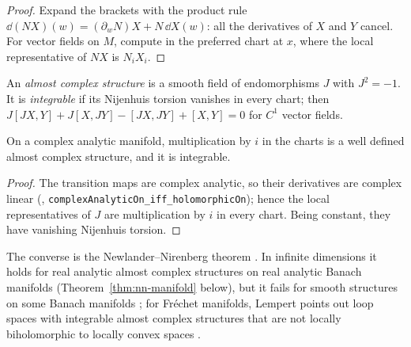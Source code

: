 \begin{proof}
  \leanok
  Expand the brackets with the product rule $\dd(NX)(w) = (\partial_w N) X + N\,\dd X(w)$: all
  the derivatives of $X$ and $Y$ cancel. For vector fields on $M$, compute in the preferred chart
  at $x$, where the local representative of $NX$ is $N_i X_i$.
\end{proof}

\begin{definition}
  \label{def:almost-complex}
  \leanok
  An \emph{almost complex structure} is a smooth field of endomorphisms $J$ with $J^2 = -1$. It
  is \emph{integrable} if its Nijenhuis torsion vanishes in every chart; then
  $J[JX, Y] + J[X, JY] - [JX, JY] + [X, Y] = 0$ for $C^1$ vector fields.
\end{definition}

\begin{theorem}
  \label{thm:canonical-J}
  \leanok
  On a complex analytic manifold, multiplication by $i$ in the charts is a well defined almost
  complex structure, and it is integrable.
\end{theorem}

\begin{proof}
  \leanok
  The transition maps are complex analytic, so their derivatives are complex linear
  (\cite{LCA}, \texttt{complexAnalyticOn\_iff\_holomorphicOn}); hence the local representatives
  of $J$ are multiplication by $i$ in every chart. Being constant, they have vanishing Nijenhuis
  torsion.
\end{proof}

The converse is the Newlander--Nirenberg theorem \cite[Theorem~1.1, p.~393]{NN57}. In infinite dimensions it holds for
real analytic almost complex structures on real analytic Banach manifolds
\cite[Theorem 7, p.~64]{Bel05} (Theorem~\ref{thm:nn-manifold} below), but it fails for smooth structures on some Banach manifolds
\cite[Theorem 3.1, p.~401]{Pat99}; for Fréchet manifolds, Lempert points out loop spaces with integrable
almost complex structures that are not locally biholomorphic to locally convex spaces
\cite[\S2, pp.~489--490]{Lem98}.

